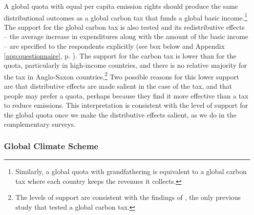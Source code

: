 A global quota with equal per capita emission rights should produce the same distributional outcomes as a global carbon tax that funds a global basic income.\footnote{Similarly,  a global quota with grandfathering is equivalent to a global carbon tax where each country keeps the revenues it collects.} The support for the global carbon tax is also tested and its redistributive effects --  the average increase in expenditures along with the amount of the basic income -- are specified to the respondents explicitly  (see box below and Appendix \ref{app:questionnaire}, p. \pageref{subsec:questionnaire_GCS}). %
The support for the carbon tax is lower than for the quota, particularly in high-income countries, and there is no relative majority for the tax in Anglo-Saxon countries.\footnote{The levels of support are consistent with the findings of \citet{carattini_how_2019}, the only previous study that tested a global carbon tax.} Two possible reasons for this lower support are that distributive effects are made salient in the case of the tax, and that people may prefer a quota, perhaps because they find it more effective than a tax to reduce emissions. This interpretation is consistent with the level of support for the global quota once we make the distributive effects salient, as we do in the complementary surveys.
\subsubsection{Global Climate Scheme}\label{subsubsec:support_gcs}

